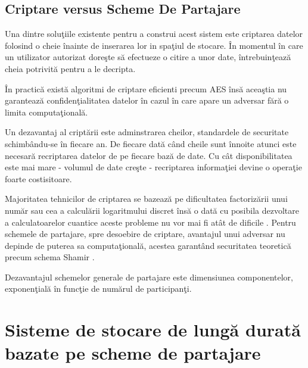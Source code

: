 \documentclass{llncs}
\begin{document}
\subsection{Criptare versus Scheme De Partajare}

Una dintre solu\c{t}iile existente pentru a construi acest sistem este criptarea datelor folosind o cheie \^{i}nainte de inserarea lor in spa\c{t}iul de stocare. \^{I}n momentul \^{i}n care un utilizator autorizat dore\c{s}te s\u{a} efectueze o citire a unor date, \^{i}ntrebuin\c{t}eaz\u{a} cheia potrivit\u{a} pentru a le decripta.

\^{I}n practic\u{a} exist\u{a} algoritmi de criptare eficienti precum AES \^{i}ns\u{a} acea\c{s}tia nu garanteaz\u{a} confiden\c{t}ialitatea datelor \^{i}n cazul \^{i}n care apare un adversar f\u{a}r\u{a} o limita computa\c{t}ional\u{a}.

Un dezavantaj al cript\u{a}rii este adminstrarea cheilor, standardele de securitate schimb\^{a}ndu-se \^{i}n fiecare an.
De fiecare dat\u{a} c\^{a}nd cheile sunt \^{i}nnoite atunci este necesar\u{a} recriptarea datelor de pe fiecare baz\u{a} de date. Cu c\^{a}t disponibilitatea este mai mare - volumul de date cre\c{s}te - recriptarea informa\c{t}iei devine o opera\c{t}ie foarte costisitoare. 

Majoritatea tehnicilor de criptarea se bazeaz\u{a} pe dificultatea factoriz\u{a}rii unui num\u{a}r sau cea a calcul\u{a}rii logaritmului discret \^{i}ns\u{a} o dat\u{a} cu posibila dezvoltare a calculatoarelor cuantice aceste probleme nu vor mai fi at\^{a}t de dificile \cite{Shor:1994}.
Pentru schemele de partajare, spre desoebire de criptare, avantajul unui adversar nu depinde de puterea sa computa\c{t}ional\u{a}, acestea garant\^{a}nd securitatea teoretic\u{a} precum schema Shamir \cite{S:1979}.

Dezavantajul schemelor generale de partajare este dimensiunea componentelor, exponen\c{t}ial\u{a} \^{i}n func\c{t}ie de num\u{a}rul de participan\c{t}i. \cite{Survey:2011}


\section{Sisteme de stocare de lung\u{a} durat\u{a} bazate pe scheme de partajare}
\label{sec:long_term_systems_full}
\end{document}
